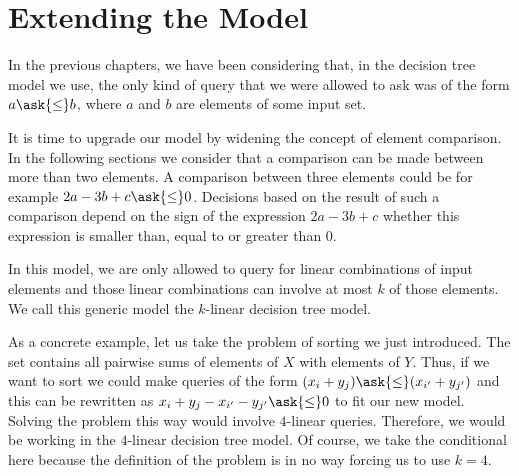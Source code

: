 \section{Extending the Model}

In the previous chapters, we have been considering that, in the decision tree
model we use, the only kind of query that we were allowed to ask was of the
form \(a \ask{\le} b \), where \(a\) and \(b\) are elements of some input set.

It is time to upgrade our model by widening the concept of element
comparison. In the following sections we consider that a comparison can be made
between more than two elements. A comparison between three elements could be
for example \(2a - 3b + c \ask{\le} 0\). Decisions based on the result of such
a comparison depend on the sign of the expression \(2a - 3b + c\) \ie whether
this expression is smaller than, equal to or greater than \(0\).

In this model, we are only allowed to query for linear combinations of
input elements and those linear combinations can involve at most \(k\) of those
elements. We call this generic model the \(k\)-linear decision tree
model.

As a concrete example, let us take the problem of sorting \XY we just introduced.
The set \XY contains all pairwise sums of elements of \(X\) with elements of
\(Y\). Thus, if we want to sort \XY we could make queries of the form \((x_i +
y_j) \ask{\le} (x_{i'} + y_{j'})\) and this can be rewritten as \( x_i +
y_j - x_{i'} - y_{j'} \ask{\le} 0\) to fit our new model. Solving the problem
this way would involve \(4\)-linear queries. Therefore, we would be working in
the \(4\)-linear decision tree model. Of course, we take the conditional here
because the definition of the problem is in no way forcing us to use \(k=4\).
